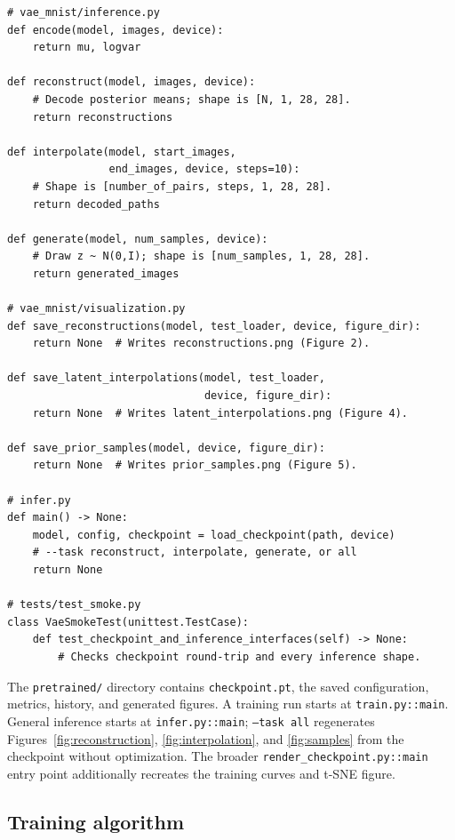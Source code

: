\documentclass[11pt]{article}
\newcommand{\code}[1]{\texttt{#1}}
\begin{document}
\begin{lstlisting}[style=pythonstyle,caption={Checkpoint inference used to generate Figures 2, 4, and 5.}]
# vae_mnist/inference.py
def encode(model, images, device):
    return mu, logvar

def reconstruct(model, images, device):
    # Decode posterior means; shape is [N, 1, 28, 28].
    return reconstructions

def interpolate(model, start_images,
                end_images, device, steps=10):
    # Shape is [number_of_pairs, steps, 1, 28, 28].
    return decoded_paths

def generate(model, num_samples, device):
    # Draw z ~ N(0,I); shape is [num_samples, 1, 28, 28].
    return generated_images

# vae_mnist/visualization.py
def save_reconstructions(model, test_loader, device, figure_dir):
    return None  # Writes reconstructions.png (Figure 2).

def save_latent_interpolations(model, test_loader,
                               device, figure_dir):
    return None  # Writes latent_interpolations.png (Figure 4).

def save_prior_samples(model, device, figure_dir):
    return None  # Writes prior_samples.png (Figure 5).

# infer.py
def main() -> None:
    model, config, checkpoint = load_checkpoint(path, device)
    # --task reconstruct, interpolate, generate, or all
    return None

# tests/test_smoke.py
class VaeSmokeTest(unittest.TestCase):
    def test_checkpoint_and_inference_interfaces(self) -> None:
        # Checks checkpoint round-trip and every inference shape.
\end{lstlisting}

The \code{pretrained/} directory contains \code{checkpoint.pt}, the saved configuration, metrics, history, and generated figures. A training run starts at \code{train.py::main}. General inference starts at \code{infer.py::main}; \code{--task all} regenerates Figures~\ref{fig:reconstruction}, \ref{fig:interpolation}, and \ref{fig:samples} from the checkpoint without optimization. The broader \code{render\_checkpoint.py::main} entry point additionally recreates the training curves and t-SNE figure.

\subsection{Training algorithm}
\end{document}
